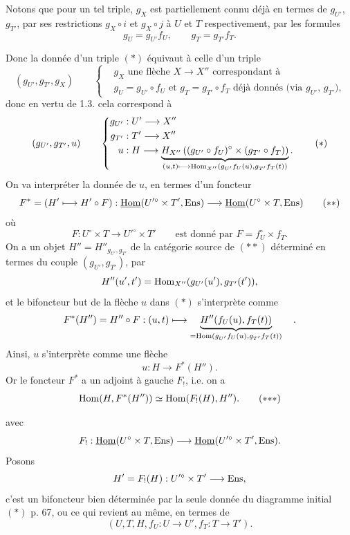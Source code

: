 Notons que pour un tel triple, $g_X$ est partiellement connu déjà en termes de $g_{U'}$, $g_{T'}$, par ses restrictions $g_X\circ i$ et $g_X\circ j$ à $U$ et $T$ respectivement, par les formules
\[
g_U = g_{U'}f_U, \qquad g_T = g_{T'}f_T.
\]

 Donc la donnée d'un triple $(*)$ équivaut à celle d'un triple
\[
(g_{U'}, g_{T'}, g_X) \qquad
\left\{\begin{aligned}
&g_X \text{ une flèche } X\longrightarrow X'' \text{ correspondant à}\\
&g_U = g_{U'}\circ f_U \text{ et } g_T = g_{T'}\circ f_T \text{ déjà donnés (via } g_{U'}\text{, } g_{T'}\text{),}
\end{aligned}\right.
\]
donc en vertu de 1.3. cela correspond à
\[
(g_{U'}, g_{T'}, u) \qquad
\left\{\begin{aligned}
g_{U'} &: U' \longrightarrow X''\\
g_{T'} &: T' \longrightarrow X''\\
u &: H \longrightarrow \underbrace{H_{X''}\left((g_{U'}\circ f_U)^{\circ}\times(g_{T'}\circ f_T)\right)}_{(u,t)\longmapsto \mathrm{Hom}_{X''}(g_{U'}f_U(u),g_{T'}f_T(t))}.
\end{aligned}\right.
\tag*{$(*)$}
\]
On va interpréter la donnée de $u$, en termes d'un foncteur
\[
F^{*} = (H'\longmapsto H'\circ F) : \underline{\mathrm{Hom}}(U'^{\circ}\times T',\mathrm{Ens}) \longrightarrow \underline{\mathrm{Hom}}(U^{\circ}\times T,\mathrm{Ens})
\tag*{$(**)$}
\]
où
\[
F : U^{\circ}\times T \longrightarrow U'^{\circ}\times T' \qquad \text{est donné par } F = f_U^{\circ}\times f_T.
\]
On a un objet $H''=H''_{g_{U'},g_{T'}}$ de la catégorie source de $(**)$ déterminé en termes du couple $(g_{U'},g_{T'})$, par
\[
H''(u',t') = \mathrm{Hom}_{X''}(g_{U'}(u'),g_{T'}(t')),
\]
et le bifoncteur but de la flèche $u$ dans $(*)$ s'interprète comme
\[
F^{*}(H'') = H''\circ F : (u,t)\longmapsto \underbrace{H''(f_U(u),f_T(t))}_{=\mathrm{Hom}(g_{U'}f_U(u),g_{T'}f_T(t))} \quad .
\]
Ainsi, $u$ s'interprète comme une flèche
\[
u : H \longrightarrow F^{*}(H'').
\]
Or le foncteur $F^{*}$ a un adjoint à gauche $F_{!}$, i.e. on a
\[
\Hom(H,F^{*}(H'')) \simeq \Hom(F_{!}(H),H'').
\tag*{$(*{*}*)$}
\]

 avec
\[
F_{!} : \underline{\mathrm{Hom}}(U^{\circ}\times T,\mathrm{Ens}) \longrightarrow \underline{\mathrm{Hom}}(U'^{\circ}\times T',\mathrm{Ens}).
\]
Posons
\[
H' = F_{!}(H) : U'^{\circ}\times T' \longrightarrow \mathrm{Ens},
\]
c'est un bifoncteur bien déterminée par la seule donnée du diagramme initial $(*)$ p. 67, ou ce qui revient au même, en termes de %
\[
(U,T,H,f_U : U\longrightarrow U', f_T : T\longrightarrow T').
\]

